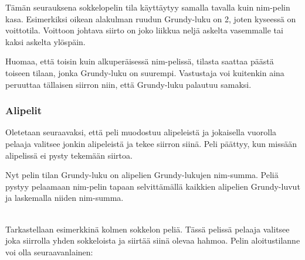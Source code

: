 Tämän seurauksena sokkelopelin
tila käyttäytyy
samalla tavalla kuin nim-pelin kasa.
Esimerkiksi oikean alakulman ruudun
Grundy-luku on 2,
joten kyseessä on voittotila.
Voittoon johtava siirto on joko liikkua neljä
askelta vasemmalle tai kaksi askelta ylöspäin.

Huomaa, että toisin kuin alkuperäisessä nim-pelissä,
tilasta saattaa päästä toiseen tilaan,
jonka Grundy-luku on suurempi.
Vastustaja voi kuitenkin aina peruuttaa
tällaisen siirron niin,
että Grundy-luku palautuu samaksi.

\subsubsection{Alipelit}

Oletetaan seuraavaksi, että peli muodostuu
alipeleistä ja jokaisella vuorolla
pelaaja valitsee jonkin alipeleistä ja
tekee siirron siinä.
Peli päättyy, kun missään alipelissä ei
pysty tekemään siirtoa.

Nyt pelin tilan Grundy-luku on alipelien
Grundy-lukujen nim-summa.
Peliä pystyy pelaamaan nim-pelin
tapaan selvittämällä kaikkien alipelien Grundy-luvut
ja laskemalla niiden nim-summa.

~\\
\noindent
Tarkastellaan esimerkkinä kolmen sokkelon peliä.
Tässä pelissä pelaaja valitsee joka siirrolla
yhden sokkeloista ja siirtää siinä olevaa hahmoa.
Pelin aloitustilanne voi olla seuraavanlainen:

